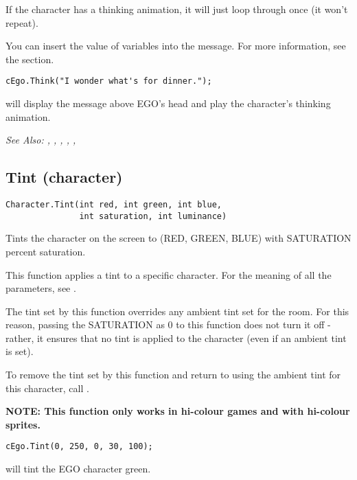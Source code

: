 If the character has a thinking animation, it will just loop through once (it won't repeat).

You can insert the value of variables into the message. For more information,
see the  section.

\begin{verbatim}
cEgo.Think("I wonder what's for dinner.");
\end{verbatim}
will display the message above EGO's head and play the character's thinking animation.

\it{See Also:} ,
,
,
,
,


\subsection{Tint (character)}\label{Character.Tint}%

\begin{verbatim}
Character.Tint(int red, int green, int blue,
               int saturation, int luminance)
\end{verbatim}

Tints the character on the screen to (RED, GREEN, BLUE) with SATURATION percent
saturation.

This function applies a tint to a specific character. For the meaning of all the parameters,
see .

The tint set by this function overrides any ambient tint set for the room. For this
reason, passing the SATURATION as 0 to this function does not turn it off - rather, it
ensures that no tint is applied to the character (even if an ambient tint is set).

To remove the tint set by this function and return to using the ambient tint for this
character, call .

\bf{NOTE:} This function only works in hi-colour games and with hi-colour sprites.

\begin{verbatim}
cEgo.Tint(0, 250, 0, 30, 100);
\end{verbatim}
will tint the EGO character green.

